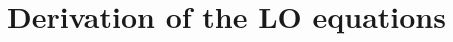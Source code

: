 \documentclass[xcolor=dvipsnames,hyperref={pdfpagelabels=false},unknownkeysallowed,
handout]{beamer}
\newcommand{\keff}[0]{\ensuremath{{k}_{\textsf{eff}}} }
\newcommand{\B}[1]{\ensuremath{\mathbf{#1}}}
\begin{document}





\section{Derivation of the LO equations}
\subsection{}
\end{document}
